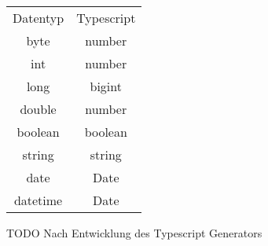 \documentclass[./einleitung.tex]{subfiles}
\begin{document}
\begin{center}
\begin{tabular}{| c || c |}
\hline
Datentyp & Typescript \\
\hhline{|=||=|}
byte & number\\
\hline
int & number\\
\hline
long & bigint\\
\hline
double & number\\
\hline
boolean & boolean \\
\hline
string & string \\
\hline
date & Date \\
\hline
datetime & Date \\
\hline
\end{tabular}
\end{center}
TODO Nach Entwicklung des Typescript Generators
\end{document}
